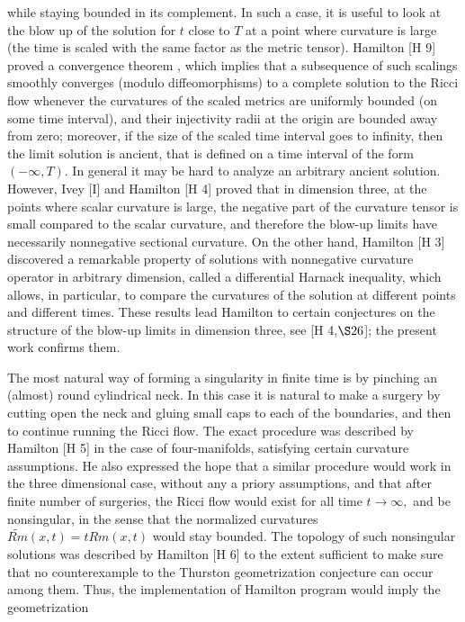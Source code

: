 \documentclass[12pt]{article}
\theoremstyle{plain}
{\swapnumbers
\newtheorem{thm}{Theorem}[section]
\newtheorem{cor}[thm]{Corollary}
\newtheorem{lem}[thm]{Lemma}
\newtheorem{prop}[thm]{Proposition}
}
\theoremstyle{definition}
{\swapnumbers
\newtheorem{defn}[thm]{Definition}
\newtheorem{nota}[thm]{Notation}
\newtheorem{parag}[thm]{}
\newtheorem*{parstr}{\addtocounter{thm}{1}\thesection.\arabic{thm}*}
\newtheorem*{intropar}{\addtocounter{thm}{1}\arabic{thm}}
}
\theoremstyle{remark} {\swapnumbers
\newtheorem{rem}[thm]{Remark}
\newtheorem{exam}[thm]{Example}
\newtheorem{lemma}[thm]{Lemma}
\newtheorem{claim}[thm]{Claim}
}
\numberwithin{equation}{section}
\begin{document}
\begin{intropar}
while staying bounded in its complement. In such a case, it is
useful to look at the blow up of the solution for $t$ close to $T$
at  a point where curvature is large (the time is scaled with the
same factor as the metric tensor). Hamilton [H 9] proved a
convergence theorem , which implies that a subsequence of such
scalings smoothly converges (modulo diffeomorphisms) to a complete
solution to the Ricci flow whenever the curvatures of the scaled
metrics are uniformly bounded (on some time interval), and their
injectivity radii at the origin are bounded away from zero;
moreover, if the size of the scaled time interval goes to
infinity, then the limit solution is ancient, that is defined on a
time interval of the form $(-\infty , T).$ In general it may be
hard to analyze an arbitrary ancient solution. However, Ivey [I]
and Hamilton [H 4] proved that in dimension three, at the points
where scalar curvature is large, the negative part of the
curvature tensor is small compared to the scalar curvature, and
therefore the blow-up limits have necessarily nonnegative
sectional curvature. On the other hand, Hamilton [H 3] discovered
a remarkable property of solutions with nonnegative curvature
operator in arbitrary dimension, called a differential Harnack
inequality, which allows, in particular, to compare the curvatures
of the solution at different points and different times. These
results lead Hamilton to certain conjectures on the structure of
the blow-up limits in dimension three, see [H 4,$ \S 26$]; the
present work confirms them.
\par The most natural way of forming a singularity in finite time
is by pinching an (almost) round cylindrical neck. In this case it
is natural to make a surgery by cutting open the neck and gluing
small caps to each of the boundaries, and then to continue running
the Ricci flow. The exact procedure was described by Hamilton [H
5] in the case of four-manifolds, satisfying certain curvature
assumptions. He also expressed the hope that a similar procedure
would work in the three dimensional case, without any a priory
assumptions, and that after finite number of surgeries, the Ricci
flow would exist for all time $t\to\infty,$ and be nonsingular, in
the sense that the normalized curvatures
$\tilde{Rm}(x,t)=tRm(x,t)$ would stay bounded. The topology of
such nonsingular solutions was described by Hamilton [H 6] to the
extent sufficient to make sure that no counterexample to the
Thurston geometrization conjecture can occur among them. Thus, the
implementation of Hamilton program would imply the geometrization

\end{intropar}
\end{document}
